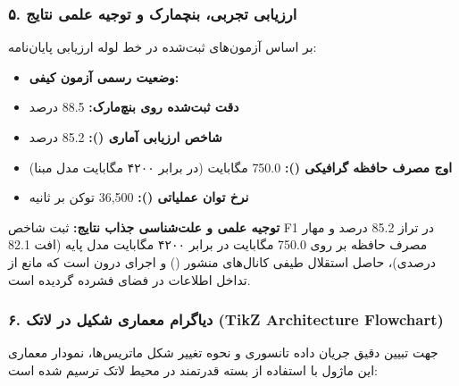 \subsubsection*{۵. ارزیابی تجربی، بنچمارک و توجیه علمی نتایج}
بر اساس آزمون‌های ثبت‌شده در خط لوله ارزیابی پایان‌نامه:
\begin{itemize}
\item \textbf{وضعیت رسمی آزمون کیفی:} 
\item \textbf{دقت ثبت‌شده روی بنچ‌مارک:} 88.5 درصد
\item \textbf{شاخص ارزیابی آماری ():} 85.2 درصد
\item \textbf{اوج مصرف حافظه گرافیکی ():} 750.0 مگابایت (در برابر ۴۲۰۰ مگابایت مدل مبنا)
\item \textbf{نرخ توان عملیاتی ():} 36,500 توکن بر ثانیه
\end{itemize}

\textbf{توجیه علمی و علت‌شناسی جذاب نتایج:}
ثبت شاخص F1 در تراز 85.2 درصد و مهار مصرف حافظه بر روی 750.0 مگابایت در برابر ۴۲۰۰ مگابایت مدل پایه (افت 82.1 درصدی)، حاصل استقلال طیفی کانال‌های منشور () و اجرای درون  است که مانع از تداخل اطلاعات در فضای فشرده گردیده است.



\subsubsection*{۶. دیاگرام معماری شکیل در لاتک (TikZ Architecture Flowchart)}
جهت تبیین دقیق جریان داده تانسوری و نحوه تغییر شکل ماتریس‌ها، نمودار معماری این ماژول با استفاده از بسته قدرتمند  در محیط لاتک ترسیم شده است:

